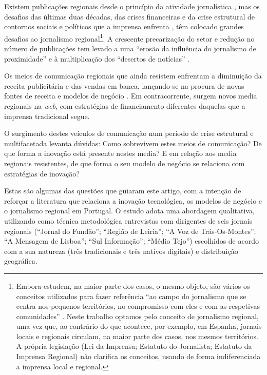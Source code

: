 \documentclass[portuguese]{textolivre}
\begin{document}
Existem publicações regionais desde o princípio da atividade
jornalística \cite{Tengarrinha2013}, mas os desafios das últimas duas
décadas, das crises financeiras e da crise estrutural de contornos
sociais e políticos que a imprensa enfrenta \cite{DeMateo2010,Christofoletti2019,Mota2023}, têm colocado grandes desafios
ao jornalismo regional\footnote{Embora estudem, na
  maior parte dos casos, o mesmo objeto, são vários os conceitos
  utilizados para fazer referência ``ao campo do jornalismo que se
  centra nos pequenos territórios, no compromisso com eles e com as
  respetivas comunidades'' \cite[p.~24]{Jeronimo2015}. Neste trabalho
  optamos pelo conceito de jornalismo regional, uma vez que, ao
  contrário do que acontece, por exemplo, em Espanha, jornais locais e
  regionais circulam, na maior parte dos casos, nos mesmos territórios.
  A própria legislação (Lei da Imprensa; Estatuto do Jornalista;
  Estatuto da Imprensa Regional) não clarifica os conceitos, usando de
  forma indiferenciada a imprensa local e regional.}. A crescente
precarização do setor e redução no número de publicações tem levado a
uma ``erosão da influência do jornalismo de proximidade''
\cite[p.~2]{Mota2023} e à multiplicação dos ``desertos de notícias''
\cite{Jeronimo2022b}.

Os meios de comunicação regionais que ainda resistem enfrentam a
diminuição da receita publicitária e das vendas em banca, lançando-se na
procura de novas fontes de receita e modelos de negócio
\cite{DeMateo2010}. Em contracorrente, surgem novos media regionais na
\emph{web}, com estratégias de financiamento diferentes daquelas que a
imprensa tradicional segue.

O surgimento destes veículos de comunicação num período de crise
estrutural e multifacetada \cite{Christofoletti2019} levanta dúvidas:
Como sobrevivem estes meios de comunicação? De que forma a inovação está
presente nestes media? E em relação aos media regionais resistentes, de
que forma o seu modelo de negócio se relaciona com estratégias de
inovação?

Estas são algumas das questões que guiaram este artigo, com a intenção
de reforçar a literatura que relaciona a inovação tecnológica, os
modelos de negócio e o jornalismo regional em Portugal. O estudo adota
uma abordagem qualitativa, utilizando como técnica metodológica
entrevistas com dirigentes de seis jornais regionais (``Jornal do
Fundão''; ``Região de Leiria''; ``A Voz de Trás-Os-Montes''; ``A
Mensagem de Lisboa''; ``Sul Informação''; ``Médio Tejo'') escolhidos de
acordo com a sua natureza (três tradicionais e três nativos digitais) e
distribuição geográfica.
\end{document}
